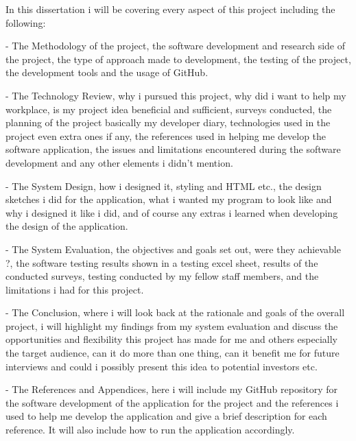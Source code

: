 In this dissertation i will be covering every aspect of this project including the following:
\newline 

- The Methodology of the project, the software development and research side of the project, the type of approach made to development, the testing of the project, the development tools and the usage of GitHub.
\newline

- The Technology Review, why i pursued this project, why did i want to help my workplace, is my project idea beneficial and sufficient, surveys conducted, the planning of the project basically my developer diary, technologies used in the project even extra ones if any, the references used in helping me develop the software application, the issues and limitations encountered during the software development and any other elements i didn't mention.
\newline

- The System Design, how i designed it, styling and HTML etc., the design sketches i did for the application, what i wanted my program to look like and why i designed it like i did, and of course any extras i learned when developing the design of the application.
\newline

- The System Evaluation, the objectives and goals set out, were they achievable ?, the software testing results shown in a testing excel sheet, results of the conducted surveys, testing conducted by my fellow staff members, and the limitations i had for this project.
\newline

- The Conclusion, where i will look back at the rationale and goals of the overall project, i will highlight my findings from my system evaluation and discuss the opportunities and flexibility this project has made for me and others especially the target audience, can it do more than one thing, can it benefit me for future interviews and could i possibly present this idea to potential investors etc.
\newline

- The References and Appendices, here i will include my GitHub repository for the software development of the application for the project and the references i used to help me develop the application and give a brief description for each reference. It will also include how to run the application accordingly.
\newline

